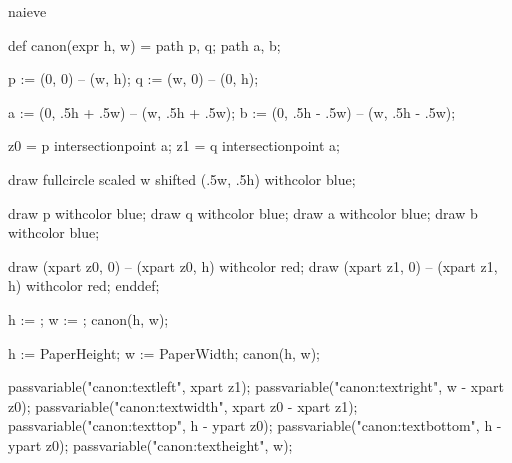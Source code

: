 

\startenvironment naieve

	\setuppagenumbering[alternative=singlesided]

	\startMPdefinitions
		def canon(expr h, w) =
			path p, q;
			path a, b;

			p := (0, 0) -- (w, h);
			q := (w, 0) -- (0, h);

			a := (0, .5h + .5w) -- (w, .5h + .5w); %
			b := (0, .5h - .5w) -- (w, .5h - .5w); %

			z0 = p intersectionpoint a; %
			z1 = q intersectionpoint a; %

			draw fullcircle scaled w shifted (.5w, .5h) withcolor blue;

			draw p withcolor blue;
			draw q withcolor blue;
			draw a withcolor blue;
			draw b withcolor blue;

			draw (xpart z0, 0) -- (xpart z0, h) withcolor red;
			draw (xpart z1, 0) -- (xpart z1, h) withcolor red;
		enddef;
	\stopMPdefinitions

		h := \overlayheight;
		w := \overlaywidth;
		canon(h, w);
	\stopreusableMPgraphic

	\startmode[debug]
		\setupbackgrounds[rightpage][background=canon]
	\stopmode

	\startMPcalculation
		h := PaperHeight;
		w := PaperWidth;
		canon(h, w);

		passvariable("canon:textleft",   xpart z1);
		passvariable("canon:textright",  w - xpart z0);
		passvariable("canon:textwidth",  xpart z0 - xpart z1);
		passvariable("canon:texttop",    h - ypart z0);
		passvariable("canon:textbottom", h - ypart z0);
		passvariable("canon:textheight", w);
	\stopMPcalculation

	\setuplayout[
		header=\bodyfontsize,
		headerdistance=\bodyfontsize, %
		top=0pt,
		topspace=\dimexpr\MPrunvar{canon:texttop}bp-\headerheight-\headerdistance\relax,
		footer=0pt,
		footerdistance=0pt,
		height=\dimexpr\MPrunvar{canon:textheight}bp
			+\headerheight+\headerdistance
			+\footerheight+\footerdistance\relax,
		backspace=\MPrunvar{canon:textleft}bp,
		margin=0pt, %
		width=\MPrunvar{canon:textwidth}bp,
	]

\stopenvironment

